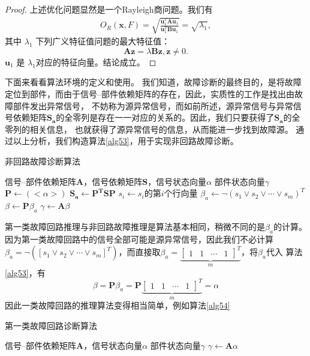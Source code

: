 \begin{proof}
  上述优化问题显然是一个Rayleigh商问题。我们有
  \begin{align}
    O_R(\mathbf{x},F)=\sqrt{\frac{\mathbf{u}_1^T\mathbf{A}\mathbf{u}_1} {\mathbf{u}_1^T\mathbf{B}\mathbf{u}_1}}=\sqrt{\lambda_1},
  \end{align}
  其中 $\lambda_1$ 下列广义特征值问题的最大特征值：
  $$
    \mathbf{A}\mathbf{z}=\lambda\mathbf{B}\mathbf{z}, \mathbf{z}\neq 0.
  $$
  $\mathbf{u}_1$ 是 $\lambda_1$对应的特征向量。结论成立。
\end{proof}

下面来看看算法环境的定义和使用。
我们知道，故障诊断的最终目的，是将故障定位到部件，而由于信号--部件依赖矩阵的存在，因此，实质性的工作是找出由故障部件发出异常信号，
不妨称为源异常信号，而如前所述，源异常信号与异常信号依赖矩阵$\mathbf{S_a}$的全零列是存在一一对应的关系的。因此，我们只要获得了$\mathbf{S_a}$的全零列的相关信息，
也就获得了源异常信号的信息，从而能进一步找到故障源。
通过以上分析，我们构造算法\ref{alg53}，用于实现非回路故障诊断。
\begin{algorithm}[htbp]
  \caption{非回路故障诊断算法}
  \label{alg53}
  \begin{algorithmic}[1]
    \REQUIRE 信号--部件依赖矩阵$\mathbf{A}$，信号依赖矩阵$\mathbf{S}$，信号状态向量$\alpha$
    \ENSURE 部件状态向量$\gamma$
    \STATE $\mathbf{P}\leftarrow\left(<\alpha>\right)$
    \STATE $\mathbf{S_{a}}\leftarrow\mathbf{P^T}\mathbf{S}\mathbf{P}$
    \STATE $s_i\leftarrow s_i$的第$i$个行向量
    \ENDFOR
    \STATE $\beta_a\leftarrow\lnot \left(s_1\lor s_2\lor \cdots\lor s_m\right)^T$
    \STATE $\beta\leftarrow\mathbf{P}\beta_a$
    \STATE $\gamma\leftarrow\mathbf{A}\beta$
  \end{algorithmic}
\end{algorithm}

第一类故障回路推理与非回路故障推理是算法基本相同，稍微不同的是$\beta_a$的计算。因为第一类故障回路中的信号全部可能是源异常信号，因此我们不必计算
$\beta_a=\lnot \left(\left[s_1\lor s_2\lor \cdots\lor s_m\right]^T\right)$，而直接取$\beta_a=\underbrace{\left[\begin{array}{cccc}1&1&\cdots&1\end{array}\right]^T}_m$，将$\beta_a$代入
算法\ref{alg53}，有
\[\beta=\mathbf{P}\beta_a=\mathbf{P}\underbrace{\left[\begin{array}{cccc}1&1&\cdots&1\end{array}\right]^T}_m=\alpha\]
因此一类故障回路的推理算法变得相当简单，例如算法\ref{alg54}
\begin{algorithm}[htbp]
  \caption{第一类故障回路诊断算法}
  \label{alg54}
  \begin{algorithmic}[1]
    \REQUIRE 信号--部件依赖矩阵$\mathbf{A}$，信号状态向量$\alpha$
    \ENSURE 部件状态向量$\gamma$
    \STATE $\gamma\leftarrow\mathbf{A}\alpha$
  \end{algorithmic}
\end{algorithm}

